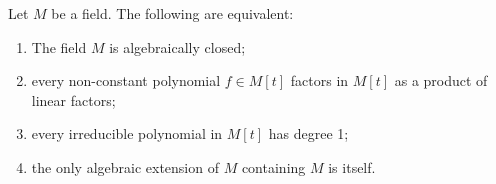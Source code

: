 \documentclass{article}
\begin{document}
\begin{tlemma}
  Let \( M \) be a field.
  The following are equivalent: \begin{enumerate}[label=(\roman*)]
    \item The field \( M \) is algebraically closed;
    \item every non-constant polynomial \( f\in M[t] \) factors in \( M[t] \) as a product of linear factors;
    \item every irreducible polynomial in \( M[t] \) has degree 1;
    \item the only algebraic extension of \( M \) containing \( M \) is itself.
  \end{enumerate}
\end{tlemma}





\end{document}
